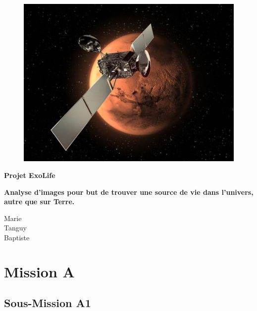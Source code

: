 \documentclass[12pt]{article}
\begin{document}
\begin{figure}
	\centering
	\includegraphics[scale=0.8]{images/logo.jpg}
\end{figure}

\hspace{\fill}

\begin{center}
	\LARGE{\textbf{Projet ExoLife}}
\end{center}


\begin{center}
\textbf{Analyse d'images pour but de trouver une source de vie dans l'univers, autre que sur Terre.}\\
\end{center}

\vspace{\fill}

\begin{flushright}
	 Marie\\
	 Tanguy\\
	 Baptiste\\
\end{flushright}

\clearpage

\tableofcontents

\newpage

\section{Mission A}

	\subsection{Sous-Mission A1}
\end{document}
